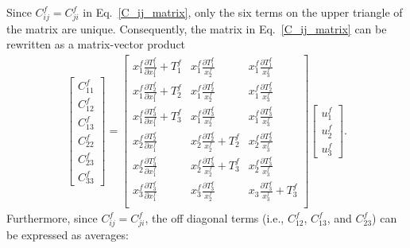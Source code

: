 \documentclass[12pt,aps,pre]{revtex4}
\begin{document}
Since $C_{ij}^f = C_{ji}^f$ in Eq.\ \eqref{C_ij_matrix}, only the six terms on the upper triangle of the matrix are unique. Consequently, the matrix in Eq.\ \eqref{C_ij_matrix} can be rewritten as a matrix-vector product
%
\begin{eqnarray}
\begin{bmatrix}
C_{11}^f \\ C_{12}^f \\ C_{13}^f \\ C_{22}^f \\
C_{23}^f \\ C_{33}^f 
\end{bmatrix}  = 
%
\begin{bmatrix}
x_1^f \frac{\partial T_1^f}{\partial x_1^f} + T_1^f & x_1^f \frac{\partial T_1^f}{x_2^f} & x_1^f \frac{\partial T_1^f}{x_3^f} \\
x_1^f \frac{\partial T_2^f}{\partial x_1^f} + T_2^f & x_1^f \frac{\partial T_2^f}{x_2^f} & x_1^f \frac{\partial T_2^f}{x_3^f} \\
x_1^f \frac{\partial T_3^f}{\partial x_1^f} + T_3^f & x_1^f \frac{\partial T_3^f}{x_2^f} & x_1^f \frac{\partial T_3^f}{x_3^f} \\
x_2^f \frac{\partial T_2^f}{\partial x_1^f} & x_2^f \frac{\partial T_2^f}{x_2^f} + T_2^f & x_2^f \frac{\partial T_2^f}{x_3^f} \\
x_2^f \frac{\partial T_3^f}{\partial x_1^f} & x_2^f \frac{\partial T_3^f}{x_2^f} + T_3^f & x_2^f \frac{\partial T_3^f}{x_3^f} \\
x_3^f \frac{\partial T_3^f}{\partial x_1^f} & x_3^f \frac{\partial T_3^f}{x_2^f} & x_3 \frac{\partial T_3^f}{x_3^f} + T_3^f \\
\end{bmatrix}
%
\begin{bmatrix}
u_1^f \\ u_2^f \\ u_3^f 
\end{bmatrix} .
%
\end{eqnarray}
%
Furthermore, since $C_{ij}^f = C_{ji}^f$, the off diagonal terms (i.e., $C_{12}^f$, $C_{13}^f$, and $C_{23}^f$) can be expressed as averages:
%
\end{document}
